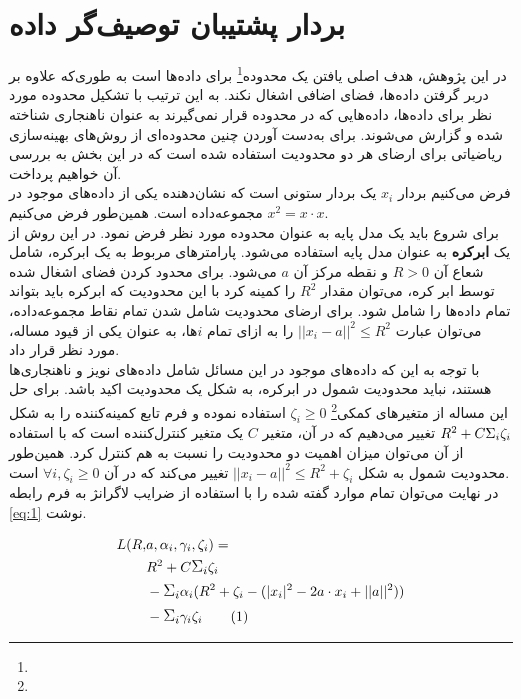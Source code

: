 \documentclass[twocolumn]{article}
\newcommand\numberthis[1][]{%
    \refstepcounter{equation}%
    \ifx#1\empty\else\label{eq:#1}\fi%
    \tag{\theequation}%
}
\newcommand{\enfootnote}[1]{\footnote{\lr{#1}}}
\begin{document}
\section[بردار پشتیبان توصیف‌گر داده]{بردار پشتیبان توصیف‌گر داده\cite{tax2004support}}
در این پژوهش، هدف اصلی یافتن یک محدوده\enfootnote{Boundary} برای داده‌ها است به طوری‌که علاوه بر دربر گرفتن داده‌ها، فضای اضافی اشغال نکند. به این ترتیب با تشکیل محدوده مورد نظر برای داده‌ها، داده‌هایی که در محدوده قرار نمی‌گیرند به عنوان ناهنجاری شناخته شده و گزارش می‌شوند. برای به‌دست‌ آوردن چنین محدوده‌ای از روش‌های بهینه‌سازی ریاضیاتی برای ارضای هر دو محدودیت استفاده شده است که در این بخش به بررسی آن خواهیم پرداخت.\\
فرض می‌کنیم بردار $x_i$ یک بردار ستونی است که نشان‌دهنده یکی از داده‌های موجود در مجموعه‌داده است. همین‌طور فرض می‌کنیم $x^2 = x \cdot x$.
\\
برای شروع باید یک مدل پایه به عنوان محدوده مورد نظر فرض نمود. در این روش از یک \textbf{ابرکره} به عنوان مدل پایه استفاده می‌شود. پارامترهای مربوط به یک ابرکره، شامل شعاع آن $R > 0$ و نقطه مرکز آن $a$ می‌شود. برای محدود کردن فضای اشغال شده توسط ابر کره، می‌توان مقدار $R^2$ را کمینه کرد با این محدودیت که ابرکره باید بتواند تمام داده‌ها را شامل شود. برای ارضای محدودیت شامل‌ شدن تمام نقاط مجموعه‌داده، می‌توان عبارت $||x_i - a||^2 \leq R^2$  را به ازای تمام $i$ها، به عنوان یکی از قیود مساله، مورد نظر قرار داد.
\\
با توجه به این‌ که داده‌های موجود در این مسائل شامل داده‌های نویز و ناهنجاری‌ها هستند، نباید محدودیت شمول در ابرکره،‌ به شکل یک محدودیت اکید باشد. برای حل این مساله از متغیر‌های کمکی\enfootnote{Slack Variable} $\zeta_i \geq 0$ استفاده نموده و فرم تابع کمینه‌کننده را به شکل $R^2 + C\mathlarger{\Sigma_i}\zeta_i$ تغییر می‌دهیم که در آن، متغیر $C$ یک متغیر کنترل‌کننده است که با استفاده از آن می‌توان میزان اهمیت دو محدودیت را نسبت به هم کنترل کرد.  همین‌طور محدودیت شمول به شکل $||x_i - a||^2 \leq R^2 + \zeta_i$ تغییر می‌کند که در آن $\forall i, \zeta_i \geq 0$ است.
\\
در نهایت می‌توان تمام موارد گفته شده را با استفاده از ضرایب لاگرانژ به فرم رابطه
\eqref{eq:1}
 نوشت.


\begin{align*}
L(R, &a, \alpha_i, \gamma_i, \zeta_i) = \\
&R^2 + C\mathlarger{\Sigma_i}\zeta_i \\
&-\mathlarger{\Sigma_i} \alpha_i (R^2 + \zeta_i -(|x_i|^2 - 2 a\cdot x_i + ||a||^2) ) \\
&-\mathlarger{\Sigma_i}\gamma_i \zeta_i
\numberthis
\label{eq:1}
\end{align*}
\end{document}
